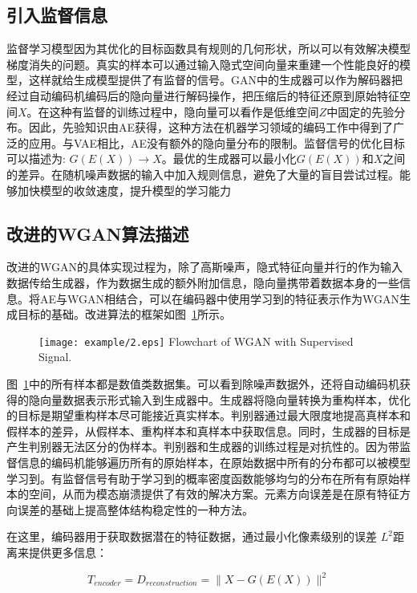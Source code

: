 \subsection{引入监督信息}
监督学习模型因为其优化的目标函数具有规则的几何形状，所以可以有效解决模型梯度消失的问题\cite{11}。真实的样本可以通过输入隐式空间向量来重建一个性能良好的模型，这样就给生成模型提供了有监督的信号。GAN中的生成器可以作为解码器把经过自动编码机编码后的隐向量进行解码操作，把压缩后的特征还原到原始特征空间$X$。在这种有监督的训练过程中，隐向量可以看作是低维空间$Z$中固定的先验分布。因此，先验知识由AE获得，这种方法在机器学习领域的编码工作中得到了广泛的应用。与VAE相比，AE没有额外的隐向量分布的限制。监督信号的优化目标可以描述为:  $ G(E(X))\rightarrow X $。最优的生成器可以最小化$ G(E(X))$和$X$之间的差异。在随机噪声数据的输入中加入规则信息，避免了大量的盲目尝试过程。能够加快模型的收敛速度，提升模型的学习能力
\subsection{改进的WGAN算法描述}
改进的WGAN的具体实现过程为，除了高斯噪声，隐式特征向量并行的作为输入数据传给生成器，作为数据生成的额外附加信息，隐向量携带着数据本身的一些信息。将AE与WGAN相结合，可以在编码器中使用学习到的特征表示作为WGAN生成目标的基础。改进算法的框架如图~\ref{fig2}所示。

\begin{figure}[htbp]
	\centering
	\texttt{[image: example/2.eps]}
	{Flowchart of WGAN with Supervised Signal.}
	\label{fig2}
\end{figure}

图~\ref{fig2}中的所有样本都是数值类数据集。可以看到除噪声数据外，还将自动编码机获得的隐向量数据表示形式输入到生成器中。生成器将隐向量转换为重构样本，优化的目标是期望重构样本尽可能接近真实样本。判别器通过最大限度地提高真样本和假样本的差异，从假样本、重构样本和真样本中获取信息。同时，生成器的目标是产生判别器无法区分的伪样本。判别器和生成器的训练过程是对抗性的。因为带监督信息的编码机能够遍历所有的原始样本，在原始数据中所有的分布都可以被模型学习到。有监督信号有助于学习到的概率密度函数能够均匀的分布在所有有原始样本的空间，从而为模态崩溃提供了有效的解决方案。元素方向误差是在原有特征方向误差的基础上提高整体结构稳定性的一种方法。

在这里，编码器用于获取数据潜在的特征数据，通过最小化像素级别的误差 $ L ^ { 2 } $距离来提供更多信息：

\begin{equation}
\label{eq11}
T_{encoder} = D_{reconstruction}=\parallel X-G(E(X))\parallel^{2}
\end{equation}

